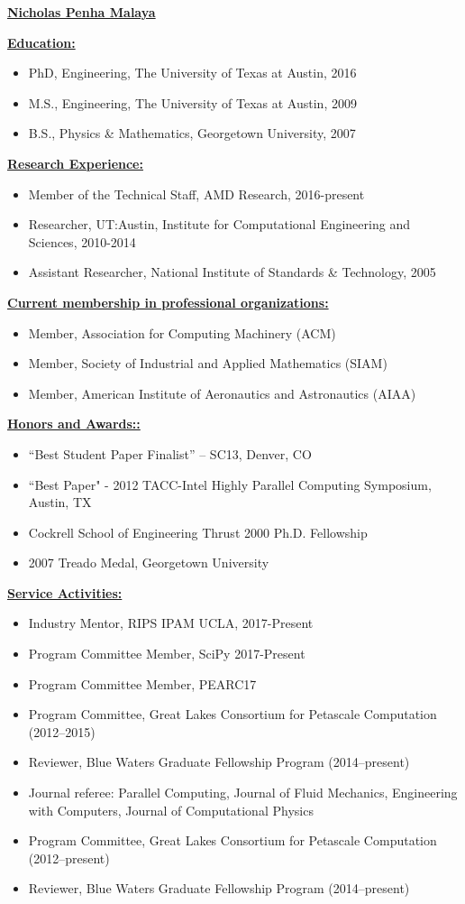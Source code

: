 \documentclass[12pt]{article}
\newcommand{\makeheading}[1]%
        {\hspace*{-\marginparsep minus \marginparwidth}%
         	\begin{center}
                {\underline{\bfseries #1}}\\%
                 \end{center}
         }
\newcommand{\makesection}[1]{\underline{\bfseries #1:}}
\begin{document}
\makeheading{Nicholas Penha Malaya}

\makesection{Education}
\begin{itemize}
\item PhD, Engineering, The University of Texas at Austin, 2016
\item M.S., Engineering, The University of Texas at Austin, 2009
\item B.S., Physics \& Mathematics, Georgetown University, 2007
\end{itemize}

\makesection{Research Experience}
\begin{itemize}
\item Member of the Technical Staff, AMD Research, 2016-present
\item Researcher, UT:Austin, Institute for Computational Engineering and Sciences, 2010-2014
\item Assistant Researcher, National Institute of Standards \& Technology, 2005
\end{itemize}

\makesection{Current membership in professional organizations}
\begin{itemize}
\item Member, Association for Computing Machinery (ACM)
\item Member, Society of Industrial and Applied Mathematics (SIAM)
\item Member, American Institute of Aeronautics and Astronautics (AIAA)
\end{itemize}

\makesection{Honors and Awards:}
\begin{itemize}
\item ``Best Student Paper Finalist'' -- SC13, Denver, CO	  
\item ``Best Paper" - 2012 TACC-Intel Highly Parallel Computing Symposium, Austin, TX
\item Cockrell School of Engineering Thrust 2000 Ph.D. Fellowship
\item 2007 Treado Medal, Georgetown University
\end{itemize}

\makesection{Service Activities}

\begin{itemize}
 \item Industry Mentor, RIPS IPAM UCLA, 2017-Present
 \item Program Committee Member, SciPy 2017-Present
 \item Program Committee Member, PEARC17
 \item Program Committee, Great Lakes Consortium for Petascale Computation (2012--2015)
 \item Reviewer, Blue Waters Graduate Fellowship Program (2014--present)
\item Journal referee: Parallel Computing, Journal of Fluid Mechanics, Engineering with Computers, Journal of Computational Physics
\item Program Committee, Great Lakes Consortium for Petascale Computation (2012--present)
\item Reviewer, Blue Waters Graduate Fellowship Program (2014--present)
\end{itemize}
\end{document}
